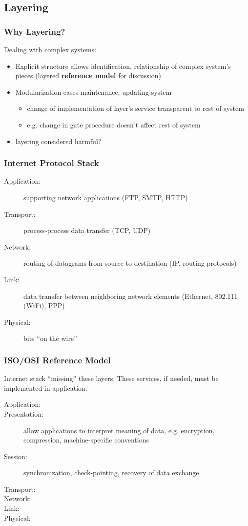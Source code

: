 \subsection{Layering}
\subsubsection{Why Layering?}
Dealing with complex systems:
\begin{itemize}
	\item Explicit structure allows identification, relationship of complex system's pieces (layered \textbf{reference model} for discussion)
	\item Modularization eases maintenance, updating system
	\begin{itemize}
		\item change of implementation of layer's service transparent to rest of system
		\item e.g. change in gate procedure doesn't affect rest of system
	\end{itemize}
	\item layering considered harmful?
\end{itemize}
\subsubsection{Internet Protocol Stack}
\begin{description}
	\item[Application:] supporting network applications (FTP, SMTP, HTTP)
	\item[Transport:] process-process data transfer (TCP, UDP)
	\item[Network:] routing of datagrams from source to destination (IP, routing protocols)
	\item[Link:] data transfer between neighboring network elements (Ethernet, 802.111 (WiFi), PPP)
	\item[Physical:] bits ``on the wire''
\end{description}
\subsubsection{ISO/OSI Reference Model}
Internet stack ``missing'' these layers. These services, if needed, must be implemented in application.
\begin{description}
	\item[Application:]
	\item[Presentation:] allow applications to interpret meaning of data, e.g. encryption, compression, machine-specific conventions
	\item[Session:] synchronization, check-pointing, recovery of data exchange
	\item[Transport:]
	\item[Network:]
	\item[Link:]
	\item[Physical:]
\end{description}

